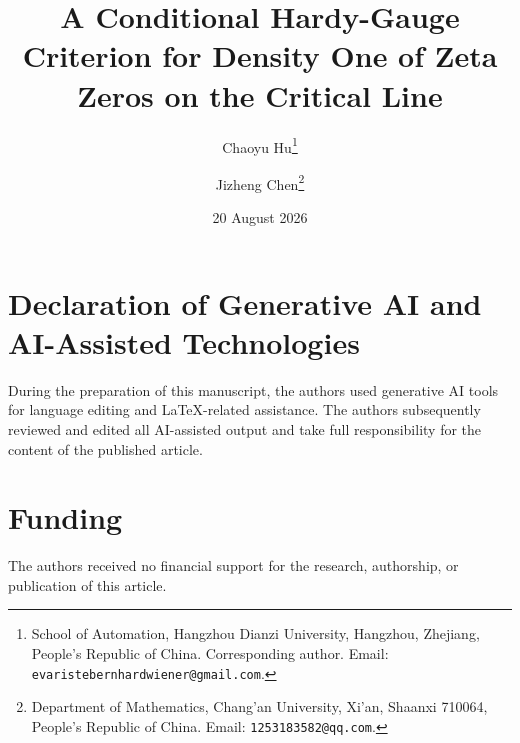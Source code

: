 \documentclass[11pt]{article}
\title{A Conditional Hardy-Gauge Criterion for Density One of Zeta Zeros on the Critical Line}
\author{Chaoyu Hu\thanks{School of Automation, Hangzhou Dianzi University, Hangzhou, Zhejiang, People's Republic of China. Corresponding author. Email: \texttt{evaristebernhardwiener@gmail.com}.}
\and Jizheng Chen\thanks{Department of Mathematics, Chang'an University, Xi'an, Shaanxi 710064, People's Republic of China. Email: \texttt{1253183582@qq.com}.}}
\date{20 August 2026}
\theoremstyle{definition}
\theoremstyle{remark}
\begin{document}
\maketitle

















\section*{Declaration of Generative AI and AI-Assisted Technologies}
During the preparation of this manuscript, the authors used generative AI tools
for language editing and \LaTeX{}-related assistance. The authors subsequently
reviewed and edited all AI-assisted output and take full responsibility for the
content of the published article.

\section*{Funding}
The authors received no financial support for the research, authorship, or
publication of this article.

\appendix



\end{document}
